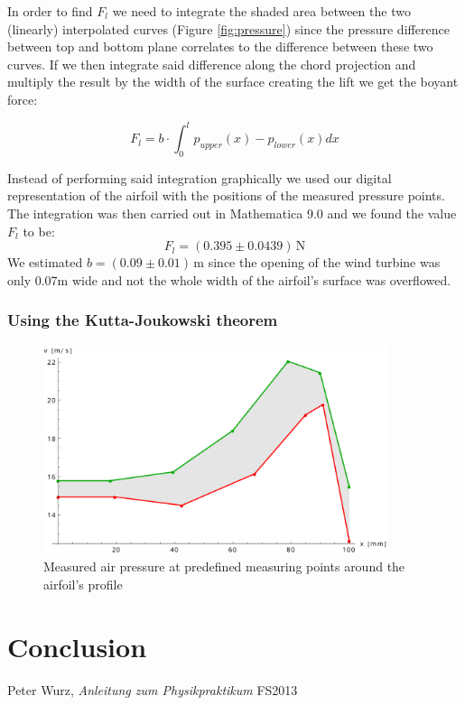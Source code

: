 \documentclass{scrreprt}
\newcommand{\unit}[1]{\ensuremath{\, \mathrm{#1}}}
\begin{document}
In order to find $F_l$ we need to integrate the shaded area between the two (linearly) interpolated curves (Figure \ref{fig:pressure}) since the pressure difference between top and bottom plane correlates to the difference between these two curves. If we then integrate said difference along the chord projection and multiply the result by the width of the surface creating the lift we get the boyant force:

\begin{equation}
F_l = b \cdot \int_0^l{p_{upper}(x)-p_{lower}(x)dx}
\end{equation}

Instead of performing said integration graphically we used our digital representation of the airfoil with the positions of the measured pressure points. The integration was then carried out in Mathematica 9.0 and we found the value $F_l$ to be:
\[F_l = (0.395 \pm 0.0439) \unit{N}\]
We estimated $b=(0.09 \pm 0.01)\unit{m}$ since the opening of the wind turbine was only 0.07m wide and not the whole width of the airfoil's surface was overflowed.


\subsubsection{Using the Kutta-Joukowski theorem}

\begin{figure}[H]
	\centering
  \includegraphics[width=0.9\textwidth]{diag/kutta-joukowsky.pdf}
	\caption{Measured air pressure at predefined measuring points around the airfoil's profile}
	\label{fig:kutta}
\end{figure}

\section{Conclusion}

\begin{thebibliography}{9}

  Peter Wurz,
  \emph{Anleitung zum Physikpraktikum}
  FS2013

\end{thebibliography}
\end{document}
